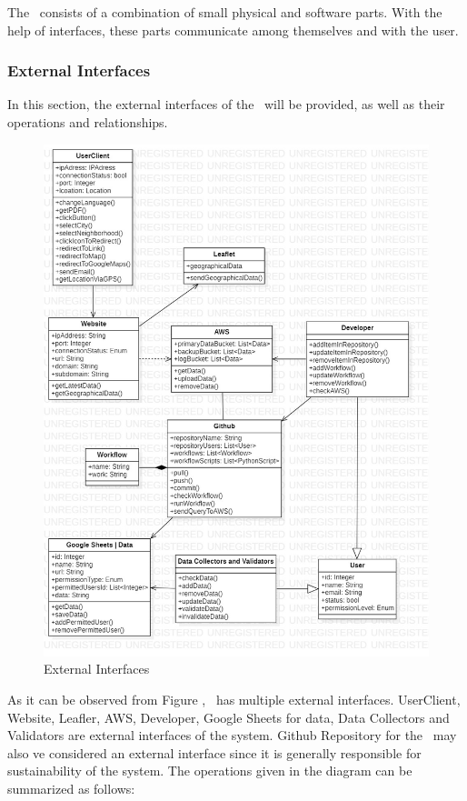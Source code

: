 The \afetbilgi\ consists of a combination of small physical and software parts. With the help of interfaces, these parts communicate among themselves and with the user.

\vspace*{\fill}
\newpage

\subsubsection{External Interfaces}

In this section, the external interfaces of the \afetbilgi\ will be provided, as well as their operations and relationships.

\begin{figure}[H]
  \centering
  \includegraphics[width=.95\linewidth]{img/external-interfaces-diagram.jpg}
  \caption{External Interfaces}
\end{figure}

As it can be observed from Figure , \afetbilgi\ has multiple external interfaces. UserClient, Website, Leafler, AWS, Developer, Google Sheets for data, Data Collectors and Validators are external interfaces of the system. Github Repository for the \afetbilgi\ may also ve considered an external interface since it is generally responsible for sustainability of the system. The operations given in the diagram can be summarized as follows:

